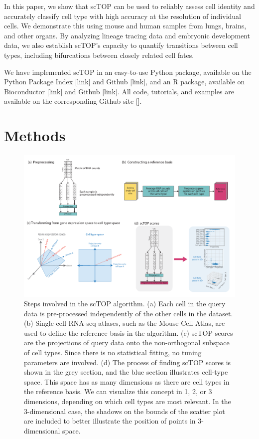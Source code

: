 \documentclass[aps,superscriptaddress, notitlepage,longbibliography]{revtex4-1}
\begin{document}
In this paper, we show that scTOP can be used to reliably assess cell identity and accurately classify cell type with high accuracy at the resolution of individual cells.  We demonstrate this using mouse and human samples from lungs, brains, and other organs. By analyzing lineage tracing data and embryonic development data, we also establish scTOP's capacity to quantify transitions between cell types, including bifurcations between closely related cell fates.

We have implemented scTOP in an easy-to-use Python package, available on the Python Package Index [link] and Github [link], and an R package, available on Bioconductor [link] and Github [link]. All code, tutorials, and examples are available on the corresponding Github site [].

\section{Methods}
\begin{figure}
	\centering
		\includegraphics[scale=0.8]{figs/scTOP manuscript fig1 - no aggregate.pdf}
	\caption{Steps involved in the scTOP algorithm. (a) Each cell in the query data is pre-processed independently of the other cells in the dataset. (b) Single-cell RNA-seq atlases, such as the Mouse Cell Atlas, are used to define the reference basis in the algorithm. (c) scTOP scores are the projections of query data onto the non-orthogonal subspace of cell types. Since there is no statistical fitting, no tuning parameters are involved. (d) The process of finding scTOP scores is shown in the grey section, and the blue section illustrates cell-type space. This space has as many dimensions as there are cell types in the reference basis. We can visualize this concept in 1, 2, or 3 dimensions, depending on which cell types are most relevant. In the 3-dimensional case, the shadows on the bounds of the scatter plot are included to better illustrate the position of points in 3-dimensional space.}
	\label{FIG:1}
\end{figure}
\end{document}
